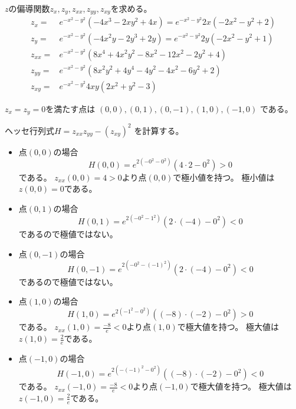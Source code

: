 \documentclass[12pt,b5paper]{ltjsarticle}
\begin{document}
$z$の偏導関数$z_x,z_y,z_{xx},z_{yy},z_{xy}$を求める。
\begin{align}
 z_x =& e^{-x^2-y^2}(-4x^3 -2xy^2 + 4x) = e^{-x^2-y^2}2x(-2x^2 -y^2 + 2)\\
 z_y =& e^{-x^2-y^2}(-4x^2y -2y^3 + 2y) = e^{-x^2-y^2}2y(-2x^2 -y^2 + 1)\\
 z_{xx} =& e^{-x^2-y^2}(8x^4 + 4x^2y^2 -8x^2 -12x^2 -2y^2 + 4)\\
 z_{yy} =& e^{-x^2-y^2}(8x^2y^2 + 4y^4 -4y^2 -4x^2 -6y^2 + 2)\\
 z_{xy} =& e^{-x^2-y^2}4xy(2x^2 + y^2 -3)
\end{align}

$z_x = z_y =0$を満たす点は
$(0,0),(0,1),(0,-1),(1,0),(-1,0)$
である。

ヘッセ行列式$H=z_{xx}z_{yy}-(z_{xy})^2$
を計算する。



\begin{itemize}
 \item
      点$(0,0)$の場合
      \begin{equation}
       H(0,0)=e^{2(-0^2-0^2)} (4\cdot 2-0^2) >0
      \end{equation}
      である。
      $z_{xx}(0,0)=4>0$より点$(0,0)$で極小値を持つ。
      極小値は$z(0,0)=0$である。


 \item
      点$(0,1)$の場合
      \begin{equation}
       H(0,1)=e^{2(-0^2-1^2)} (2\cdot (-4) - 0^2) <0
      \end{equation}
      であるので極値ではない。

 \item
      点$(0,-1)$の場合
      \begin{equation}
       H(0,-1)=e^{2(-0^2-(-1)^2)} (2\cdot (-4) - 0^2) <0
      \end{equation}
      であるので極値ではない。


 \item
      点$(1,0)$の場合
      \begin{equation}
       H(1,0)=e^{2(-1^2-0^2)} ((-8)\cdot (-2) - 0^2) >0
      \end{equation}
      である。
      $z_{xx}(1,0)=\frac{-8}{e}<0$より点$(1,0)$で極大値を持つ。
      極大値は$z(1,0)=\frac{2}{e}$である。


 \item
      点$(-1,0)$の場合
      \begin{equation}
       H(-1,0)=e^{2(-(-1)^2-0^2)} ((-8)\cdot (-2) - 0^2) <0
      \end{equation}
      である。
      $z_{xx}(-1,0)=\frac{-8}{e}<0$より点$(-1,0)$で極大値を持つ。
      極大値は$z(-1,0)=\frac{2}{e}$である。



\end{itemize}
\end{document}
